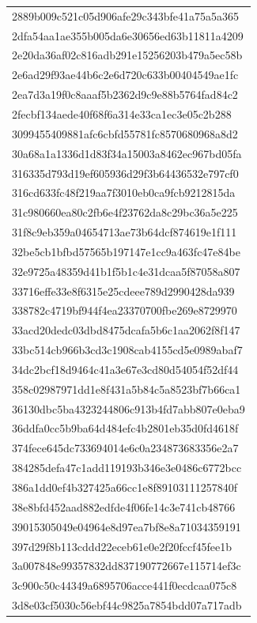 \begin{tabular}{l}
2889b009c521c05d906afe29c343bfe41a75a5a365 \\
2dfa54aa1ae355b005da6e30656ed63b11811a4209 \\
2e20da36af02c816adb291e15256203b479a5ec58b \\
2e6ad29f93ae44b6c2e6d720c633b00404549ae1fc \\
2ea7d3a19f0c8aaaf5b2362d9c9e88b5764fad84c2 \\
2fecbf134aede40f68f6a314e33ca1ec3e05c2b288 \\
3099455409881afc6cbfd55781fc8570680968a8d2 \\
30a68a1a1336d1d83f34a15003a8462ec967bd05fa \\
316335d793d19ef605936d29f3b64436532e797cf0 \\
316cd633fc48f219aa7f3010eb0ca9fcb9212815da \\
31c980660ea80c2fb6e4f23762da8c29bc36a5e225 \\
31f8c9eb359a04654713ae73b64dcf874619e1f111 \\
32be5cb1bfbd57565b197147e1cc9a463fc47e84be \\
32e9725a48359d41b1f5b1c4e31dcaa5f87058a807 \\
33716effe33e8f6315e25cdeee789d2990428da939 \\
338782c4719bf944f4ea23370700fbe269e8729970 \\
33acd20dedc03dbd8475dcafa5b6c1aa2062f8f147 \\
33bc514cb966b3cd3c1908cab4155cd5e0989abaf7 \\
34dc2bcf18d9464c41a3e67e3cd80d54054f52df44 \\
358c02987971dd1e8f431a5b84c5a8523bf7b66ca1 \\
36130dbc5ba4323244806c913b4fd7abb807e0eba9 \\
36ddfa0cc5b9ba64d484efc4b2801eb35d0fd4618f \\
374fece645dc733694014e6c0a234873683356e2a7 \\
384285defa47c1add119193b346e3e0486c6772bcc \\
386a1dd0ef4b327425a66cc1e8f89103111257840f \\
38e8bfd452aad882edfde4f06fe14c3e741cb48766 \\
39015305049e04964e8d97ea7bf8e8a71034359191 \\
397d29f8b113cddd22eceb61e0e2f20fccf45fee1b \\
3a007848e99357832dd837190772667e115714ef3c \\
3c900c50c44349a6895706acce441f0ecdcaa075c8 \\
3d8e03cf5030c56ebf44c9825a7854bdd07a717adb \\

\end{tabular}
